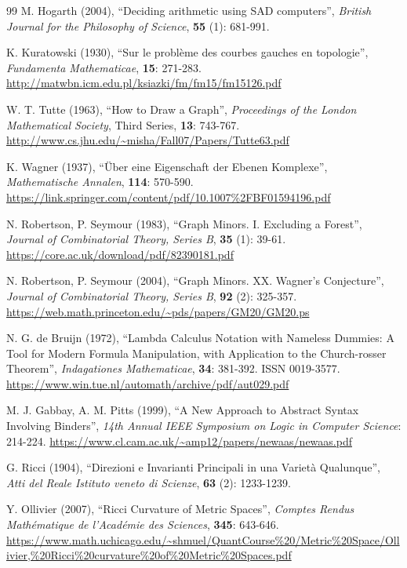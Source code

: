 \documentclass{article}
\begin{document}
\begin{thebibliography}{99}
M. Hogarth (2004), ``Deciding arithmetic using SAD computers'', \textit{British Journal for the Philosophy of Science}, \textbf{55} (1): 681-991.

K. Kuratowski (1930), ``Sur le probl\`eme des courbes gauches en topologie'', \textit{Fundamenta Mathematicae}, \textbf{15}: 271-283. \url{http://matwbn.icm.edu.pl/ksiazki/fm/fm15/fm15126.pdf}

W. T. Tutte (1963), ``How to Draw a Graph'', \textit{Proceedings of the London Mathematical Society}, Third Series, \textbf{13}: 743-767. \url{http://www.cs.jhu.edu/~misha/Fall07/Papers/Tutte63.pdf}

K. Wagner (1937), ``\"Uber eine Eigenschaft der Ebenen Komplexe'', \textit{Mathematische Annalen}, \textbf{114}: 570-590. \url{https://link.springer.com/content/pdf/10.1007%2FBF01594196.pdf}

N. Robertson, P. Seymour (1983), ``Graph Minors. I. Excluding a Forest'', \textit{Journal of Combinatorial Theory, Series B}, \textbf{35} (1): 39-61. \url{https://core.ac.uk/download/pdf/82390181.pdf}

N. Robertson, P. Seymour (2004), ``Graph Minors. XX. Wagner's Conjecture'', \textit{Journal of Combinatorial Theory, Series B}, \textbf{92} (2): 325-357. \url{https://web.math.princeton.edu/~pds/papers/GM20/GM20.ps}

N. G. de Bruijn (1972), ``Lambda Calculus Notation with Nameless Dummies: A Tool for Modern Formula Manipulation, with Application to the Church-rosser Theorem'', \textit{Indagationes Mathematicae}, \textbf{34}: 381-392. ISSN 0019-3577. \url{https://www.win.tue.nl/automath/archive/pdf/aut029.pdf}

M. J. Gabbay, A. M. Pitts (1999), ``A New Approach to Abstract Syntax Involving Binders'', \textit{14th Annual IEEE Symposium on Logic in Computer Science}: 214-224. \url{https://www.cl.cam.ac.uk/~amp12/papers/newaas/newaas.pdf}

G. Ricci (1904), ``Direzioni e Invarianti Principali in una Variet\`a Qualunque'', \textit{Atti del Reale Istituto veneto di Scienze}, \textbf{63} (2): 1233-1239.

Y. Ollivier (2007), ``Ricci Curvature of Metric Spaces'', \textit{Comptes Rendus Math\'ematique de l'Acad\'emie des Sciences}, \textbf{345}: 643-646. \url{https://www.math.uchicago.edu/~shmuel/QuantCourse%20/Metric%20Space/Ollivier,%20Ricci%20curvature%20of%20Metric%20Spaces.pdf}


\end{thebibliography}
\end{document}
